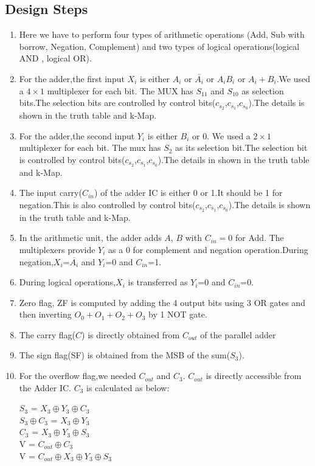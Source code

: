 \documentclass[11pt]{article}
\begin{document}
\subsection{Design Steps}
\begin{enumerate}
    \item Here we have to perform four types of arithmetic operations (Add, Sub with borrow, Negation, Complement) and two types of logical operations(logical AND , logical OR).

    \item For the adder,the first input $X_i$ is either $A_i$ or $\bar{A_i}$ or $A_i B_i$  or $A_i + B_i$.We used a $4 \times 1$    multiplexer  for  each  bit.
     The MUX has  $S_{11}$ and $S_{10}$ as selection bits.The selection bits are controlled by control bits($c_{s_2}$,$c_{s_1}$,$c_{s_0}$).The details is shown in the truth table and k-Map.

     \item For the adder,the second input $Y_i$ is either $B_i$ or 0. We used a $2 \times 1$ multiplexer for each bit. 
     The mux has $S_{2}$ as its selection bit.The selection bit is controlled by control bits($c_{s_2}$,$c_{s_1}$,$c_{s_0}$).The details in shown in the truth table and k-Map.

    \item The input carry($C_{in}$) of the adder IC is either 0 or 1.It should be 1 for negation.This is also controlled by control bits($c_{s_2}$,$c_{s_1}$,$c_{s_0}$).The details is shown in the truth table and k-Map.

    \item In the arithmetic unit, the adder adds $A$, $B$ with $C_{in}=0$ for Add. The multiplexers provide $Y_i$ as a 0 for complement and negation operation.During negation,$X_i$=$\overline{A_i}$ and $Y_i$=0 and $C_{in}$=1. 
    
    \item During logical operations,$X_i$ is transferred as $Y_i$=0 and $C_{in}$=0.

    \item Zero flag, ZF is computed by adding the 4 output bits using 3 OR gates and then inverting $O_0 + O_1+O_2+O_3$ by 1 NOT gate.
    \item The carry flag($C$) is directly obtained from $C_{out}$ of the parallel adder
    \item The sign flag(SF) is obtained from the MSB of the sum($S_3$).
    \item  For the overflow flag,we needed $C_{out}$ and $C_3$. $C_{out}$ is directly accessible from the Adder IC. $C_3$ is calculated as below:
    \begin{center}
        $S_3$ = $X_3 \oplus Y_3 \oplus C_3$\\
        $S_3 \oplus C_3$ = $X_3 \oplus Y_3$\\
        $C_3$ = $X_3 \oplus Y_3 \oplus S_3$\\
        V = $C_{out} \oplus C_3$\\
        V = $C_{out} \oplus X_3 \oplus Y_3 \oplus  S_3$
    \end{center}
\end{enumerate}
\end{document}
